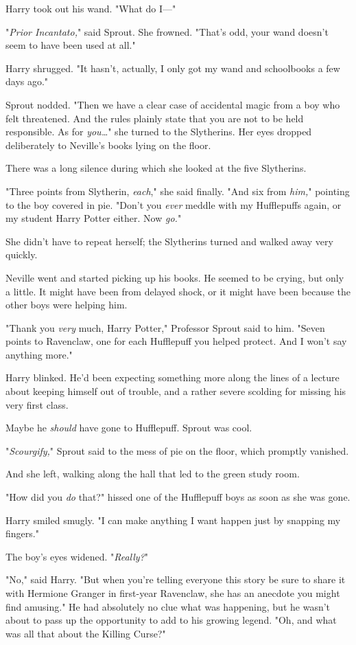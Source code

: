 Harry took out his wand. "What do I---"

"\emph{Prior Incantato,}" said Sprout. She frowned. "That's odd, your wand
doesn't seem to have been used at all."

Harry shrugged. "It hasn't, actually, I only got my wand and schoolbooks a few
days ago."

Sprout nodded. "Then we have a clear case of accidental magic from a boy who
felt threatened. And the rules plainly state that you are not to be held
responsible. As for \emph{you{\ldots}}" she turned to the Slytherins. Her eyes
dropped deliberately to Neville's books lying on the floor.

There was a long silence during which she looked at the five Slytherins.

"Three points from Slytherin, \emph{each}," she said finally. "And six from
\emph{him,}" pointing to the boy covered in pie. "Don't you \emph{ever} meddle
with my Hufflepuffs again, or my student Harry Potter either. Now \emph{go.}"

She didn't have to repeat herself; the Slytherins turned and walked away very
quickly.

Neville went and started picking up his books. He seemed to be crying, but only
a little. It might have been from delayed shock, or it might have been because
the other boys were helping him.

"Thank you \emph{very} much, Harry Potter," Professor Sprout said to him.
"Seven points to Ravenclaw, one for each Hufflepuff you helped protect. And I
won't say anything more."

Harry blinked. He'd been expecting something more along the lines of a lecture
about keeping himself out of trouble, and a rather severe scolding for missing
his very first class.

Maybe he \emph{should} have gone to Hufflepuff. Sprout was cool.

"\emph{Scourgify,}" Sprout said to the mess of pie on the floor, which promptly
vanished.

And she left, walking along the hall that led to the green study room.

"How did you \emph{do} that?" hissed one of the Hufflepuff boys as soon as she
was gone.

Harry smiled smugly. "I can make anything I want happen just by snapping my
fingers."

The boy's eyes widened. "\emph{Really?}"

"No," said Harry. "But when you're telling everyone this story be sure to share
it with Hermione Granger in first-year Ravenclaw, she has an anecdote you might
find amusing." He had absolutely no clue what was happening, but he wasn't
about to pass up the opportunity to add to his growing legend. "Oh, and what
was all that about the Killing Curse?"

